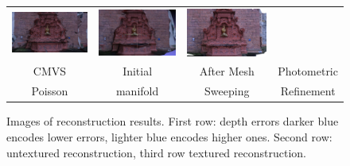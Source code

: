 \begin{figure}[t]
\begin{tabular}{cccc}
\includegraphics[width=0.25\columnwidth,height=0.1\textwidth]{./img/first_tex}&
\includegraphics[width=0.25\columnwidth,height=0.1\textwidth]{./img/myresTex}&
\includegraphics[width=0.25\columnwidth,height=0.1\textwidth]{./img/photo_mesh_rgb_crop}\\
CMVS &
Initial&
After Mesh&
Photometric\\
Poisson &
manifold&
 Sweeping&
Refinement\\
\end{tabular}
\caption{Images of reconstruction results. First row: depth errors darker blue encodes lower errors, lighter blue encodes higher ones. Second row: untextured reconstruction, third row textured reconstruction.}
\label{fig:fountainIm}
\end{figure}



